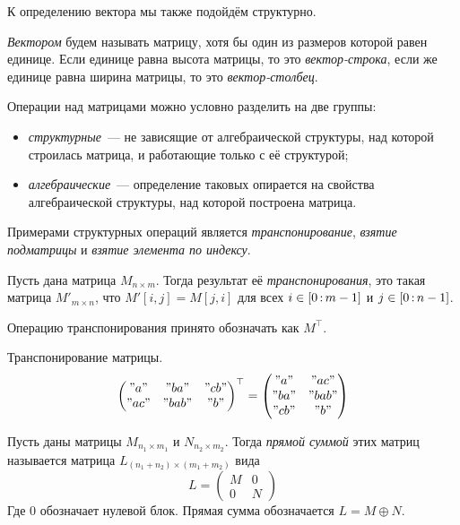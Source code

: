 К определению вектора мы также подойдём структурно.
\begin{definition}[Вектор]
    \emph{Вектором} будем называть матрицу, хотя бы один из размеров которой равен единице.
    Если единице равна высота матрицы, то это \emph{вектор-строка}, если же единице равна ширина матрицы, то это \emph{вектор-столбец}.
\end{definition}

Операции над матрицами можно условно разделить на две группы:
\begin{itemize}
    \item \emph{структурные}~--- не зависящие от алгебраической структуры, над которой строилась матрица, и работающие только с её структурой;
    \item \emph{алгебраические}~--- определение таковых опирается на свойства алгебраической структуры, над которой построена матрица.
\end{itemize}

Примерами структурных операций является \emph{транспонирование}, \emph{взятие подматрицы} и \emph{взятие элемента по индексу}.

\begin{definition}
    Пусть дана матрица $M_{n \times m}$.
    Тогда результат её \emph{транспонирования}, это такая матрица $M'_{m \times n}$, что $M'[i,j] = M[j,i]$ для всех $i \in [0 \rng m - 1]$ и $j \in [0 \rng n - 1]$.

    Операцию транспонирования принято обозначать как $M^\top$.
\end{definition}

\begin{example}
    Транспонирование матрицы.
    \[
        \begin{pmatrix}
            "a"  & "ba"  & "cb" \\
            "ac" & "bab" & "b"
        \end{pmatrix}^\top =
        \begin{pmatrix}
            "a"  & "ac"  \\
            "ba" & "bab" \\
            "cb" & "b"
        \end{pmatrix}
    \]
\end{example}

\begin{definition}
    Пусть даны матрицы $M_{n_1 \times m_1}$ и $N_{n_2 \times m_2}$.
    Тогда \emph{прямой суммой} этих матриц называется матрица $L_{(n_1 + n_2) \times (m_1 + m_2)}$ вида
    \[
        L =
        \begin{pmatrix}
            M & 0 \\
            0 & N
        \end{pmatrix}
    \]
    Где 0 обозначает нулевой блок. Прямая сумма обозначается $L = M \oplus N$.
\end{definition}

